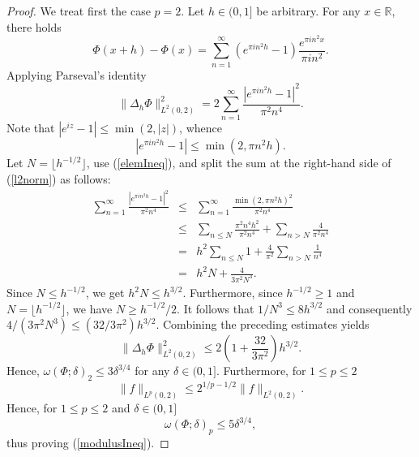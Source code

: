 \documentclass[10pt,a4paper]{amsart}
\begin{document}
\begin{proof}
We treat first the case $p=2$. Let $h\in(0,1]$ be arbitrary. For any $x\in\mathbb{R}$, there holds
\begin{equation}
    \nonumber
    \Phi(x+h)-\Phi(x)=\sum_{n=1}^\infty(e^{\pi i n^2h}-1)\frac{e^{\pi i n^2 x}}{\pi in^2}.
\end{equation}
Applying Parseval's identity
\begin{equation}
    \label{l2norm}
    \|\Delta_h\Phi\|^2_{L^2(0,2)}=2\sum_{n=1}^\infty\frac{|e^{\pi i n^2h}-1|^2}{\pi^2 n^4}.
\end{equation}
Note that $|e^{iz}-1|\le\min(2,|z|)$, whence
\begin{equation}
    \label{elemIneq}
    |e^{\pi i n^2h}-1|\le\min(2,\pi n^2h).
\end{equation}
Let $N=\lfloor h^{-1/2}\rfloor$, use (\ref{elemIneq}), and split the sum at the right-hand side of (\ref{l2norm}) as follows:
\begin{eqnarray}
    \nonumber
    \sum_{n=1}^\infty\frac{|e^{\pi i n^2h}-1|^2}{\pi^2 n^4}&\le&\sum_{n=1}^\infty\frac{\min(2,\pi n^2h)^2}{\pi^2n^4}\\
    \nonumber
    &\le &\sum_{n\le N}\frac{\pi^2 n^4h^2}{\pi^2 n^4}+\sum_{n> N}\frac{4}{\pi^2 n^4}\\
    \nonumber
    &=&h^2\sum_{n\le N}1+\frac{4}{\pi^2}\sum_{n> N}\frac{1}{n^4}\\
    \nonumber
    &=& h^2N+\frac{4}{3\pi^2N^3}.
\end{eqnarray}
Since $N\le h^{-1/2}$, we get $h^2N\le h^{3/2}$. Furthermore, since $h^{-1/2}\ge1$ and $N=\lfloor h^{-1/2}\rfloor$, we have $N\ge h^{-1/2}/2$. It follows that $1/N^3\le 8h^{3/2}$ and consequently $4/(3\pi^2 N^3)\le (32/3\pi^2)h^{3/2}$. Combining the preceding estimates yields
\begin{equation}
    \nonumber
    \|\Delta_h\Phi\|^2_{L^2(0,2)}\le 2\left(1+\frac{32}{3\pi^2}\right)h^{3/2}.
\end{equation}
Hence, $\omega(\Phi;\delta)_2\le3\delta^{3/4}$ for any $\delta\in(0,1]$. Furthermore, for $1\le p\le 2$
\begin{equation}
    \nonumber
    \|f\|_{L^p(0,2)}\le 2^{1/p-1/2}\|f\|_{L^2(0,2)}.
\end{equation}
Hence, for $1\le p\le 2$ and $\delta\in(0,1]$
\begin{equation}
    \nonumber
    \omega(\Phi;\delta)_p\le5\delta^{3/4},
\end{equation}
thus proving (\ref{modulusIneq}).
\end{proof}
\end{document}

